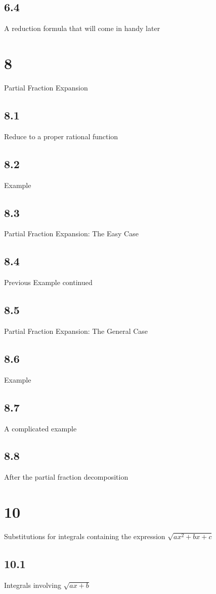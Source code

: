\subsection{6.4}{A reduction formula that will come in handy later}

\section{8}{Partial Fraction Expansion}
\subsection{8.1}{Reduce to a proper rational function}
\subsection{8.2}{Example}
\subsection{8.3}{Partial Fraction Expansion: The Easy Case}
\subsection{8.4}{Previous Example continued}
\subsection{8.5}{Partial Fraction Expansion: The General Case}
\subsection{8.6}{Example}
\subsection{8.7}{A complicated example}
\subsection{8.8}{After the partial fraction decomposition}

\section{10}{Substitutions for integrals containing the expression $\sqrt {ax^2+bx+c}$}
\subsection{10.1}{Integrals involving $\sqrt {ax+b}$}
